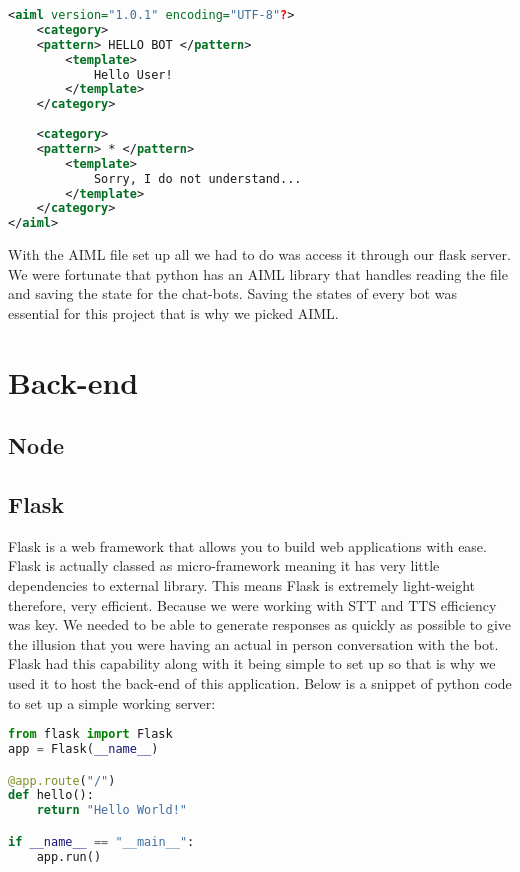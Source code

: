 \begin{lstlisting}[language=XML]
<aiml version="1.0.1" encoding="UTF-8"?>
    <category>
    <pattern> HELLO BOT </pattern>
        <template>
            Hello User!
        </template>
    </category>
    
    <category>
    <pattern> * </pattern>
        <template>
            Sorry, I do not understand...
        </template>
    </category>
</aiml>

\end{lstlisting}

With the AIML file set up all we had to do was access it through our flask server. We were fortunate that python has an AIML library that handles reading the file and saving the state for the chat-bots. Saving the states of every bot was essential for this project that is why we picked AIML.



\section{Back-end}
\subsection{Node}

\subsection{Flask}
Flask is a web framework that allows you to build web applications with ease. Flask is actually classed as micro-framework meaning it has very little dependencies to external library. This means Flask is extremely light-weight therefore, very efficient. Because we were working with STT and TTS efficiency was key. We needed to be able to generate responses as quickly as possible to give the illusion that you were having an actual in person conversation with the bot. Flask had this capability along with it being simple to set up so that is why we used it to host the back-end of this application. Below is a snippet of python code to set up a simple working server:

\begin{lstlisting}[language=PYTHON]
from flask import Flask
app = Flask(__name__)

@app.route("/")
def hello():
    return "Hello World!"

if __name__ == "__main__":
    app.run()

\end{lstlisting}

